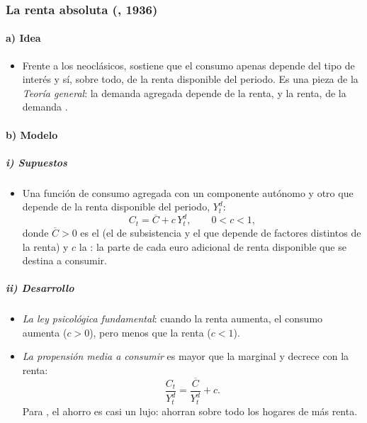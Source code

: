 \documentclass[11pt]{article}
\begin{document}
\subsubsection{La renta absoluta (, 1936)}\label{sec:keynes}

\paragraph{a) Idea}

\begin{itemize}
\item Frente a los neoclásicos, \textcite{Keynes1936} sostiene que el consumo apenas depende del tipo de interés y sí, sobre todo, de la renta disponible del periodo. Es una pieza de la \emph{Teoría general}: la demanda agregada depende de la renta, y la renta, de la demanda .
\end{itemize}

\paragraph{b) Modelo}

\subparagraph{i) Supuestos}

\begin{itemize}
\item Una función de consumo agregada con un componente autónomo y otro que depende de la renta disponible del periodo, $Y^d_t$:
  \begin{equation}
  C_t=\overline{C}+c\,Y^d_t,\qquad 0<c<1,\label{eq:keynes}
  \end{equation}
  donde $\overline{C}>0$ es el  (el de subsistencia y el que depende de factores distintos de la renta) y $c$ la : la parte de cada euro adicional de renta disponible que se destina a consumir.
\end{itemize}

\subparagraph{ii) Desarrollo}

\begin{itemize}
\item \emph{La ley psicológica fundamental}: cuando la renta aumenta, el consumo aumenta ($c>0$), pero menos que la renta ($c<1$).
\item \emph{La propensión media a consumir} es mayor que la marginal y decrece con la renta:
  \begin{equation*}
  \frac{C_t}{Y^d_t}=\frac{\overline{C}}{Y^d_t}+c.
  \end{equation*}
  Para , el ahorro es casi un lujo: ahorran sobre todo los hogares de más renta.
\end{itemize}
\end{document}

